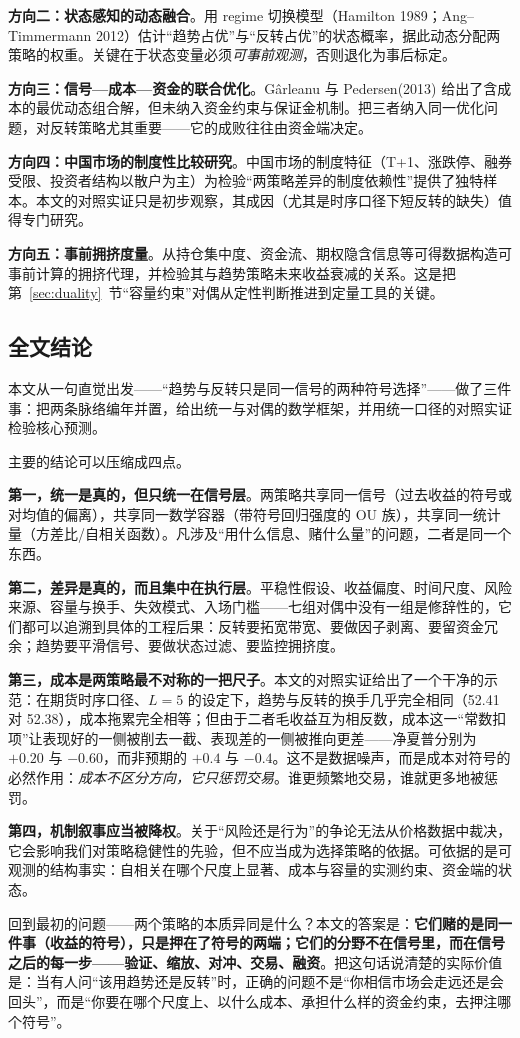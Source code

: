 \textbf{方向二：状态感知的动态融合}。用 regime 切换模型（Hamilton 1989；Ang--Timmermann 2012）估计“趋势占优”与“反转占优”的状态概率，据此动态分配两策略的权重\cite{hamilton1989,angtimmermann2012}。关键在于状态变量必须\emph{可事前观测}，否则退化为事后标定。

\textbf{方向三：信号—成本—资金的联合优化}。Gârleanu 与 Pedersen(2013) 给出了含成本的最优动态组合解\cite{garleanu2013}，但未纳入资金约束与保证金机制。把三者纳入同一优化问题，对反转策略尤其重要——它的成败往往由资金端决定。

\textbf{方向四：中国市场的制度性比较研究}。中国市场的制度特征（T+1、涨跌停、融券受限、投资者结构以散户为主）为检验“两策略差异的制度依赖性”提供了独特样本。本文的对照实证只是初步观察，其成因（尤其是时序口径下短反转的缺失）值得专门研究。

\textbf{方向五：事前拥挤度量}。从持仓集中度、资金流、期权隐含信息等可得数据构造可事前计算的拥挤代理，并检验其与趋势策略未来收益衰减的关系。这是把第~\ref{sec:duality}~节“容量约束”对偶从定性判断推进到定量工具的关键。

\subsection{全文结论}

本文从一句直觉出发——“趋势与反转只是同一信号的两种符号选择”——做了三件事：把两条脉络编年并置，给出统一与对偶的数学框架，并用统一口径的对照实证检验核心预测。

主要的结论可以压缩成四点。

\textbf{第一，统一是真的，但只统一在信号层}。两策略共享同一信号（过去收益的符号或对均值的偏离），共享同一数学容器（带符号回归强度的 OU 族），共享同一统计量（方差比/自相关函数）。凡涉及“用什么信息、赌什么量”的问题，二者是同一个东西。

\textbf{第二，差异是真的，而且集中在执行层}。平稳性假设、收益偏度、时间尺度、风险来源、容量与换手、失效模式、入场门槛——七组对偶中没有一组是修辞性的，它们都可以追溯到具体的工程后果：反转要拓宽带宽、要做因子剥离、要留资金冗余；趋势要平滑信号、要做状态过滤、要监控拥挤度。

\textbf{第三，成本是两策略最不对称的一把尺子}。本文的对照实证给出了一个干净的示范：在期货时序口径、$L=5$ 的设定下，趋势与反转的换手几乎完全相同（52.41 对 52.38），成本拖累完全相等；但由于二者毛收益互为相反数，成本这一“常数扣项”让表现好的一侧被削去一截、表现差的一侧被推向更差——净夏普分别为 $+0.20$ 与 $-0.60$，而非预期的 $+0.4$ 与 $-0.4$。这不是数据噪声，而是成本对符号的必然作用：\emph{成本不区分方向，它只惩罚交易}。谁更频繁地交易，谁就更多地被惩罚。

\textbf{第四，机制叙事应当被降权}。关于“风险还是行为”的争论无法从价格数据中裁决，它会影响我们对策略稳健性的先验，但不应当成为选择策略的依据。可依据的是可观测的结构事实：自相关在哪个尺度上显著、成本与容量的实测约束、资金端的状态。

回到最初的问题——两个策略的本质异同是什么？本文的答案是：\textbf{它们赌的是同一件事（收益的符号），只是押在了符号的两端；它们的分野不在信号里，而在信号之后的每一步——验证、缩放、对冲、交易、融资}。把这句话说清楚的实际价值是：当有人问“该用趋势还是反转”时，正确的问题不是“你相信市场会走远还是会回头”，而是“你要在哪个尺度上、以什么成本、承担什么样的资金约束，去押注哪个符号”。
